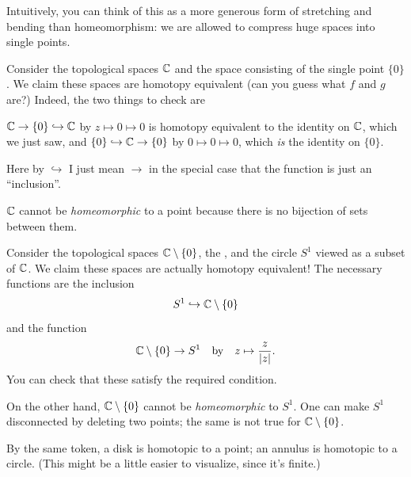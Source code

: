 Intuitively, you can think of this as a more generous form of stretching
and bending than homeomorphism: we are allowed to compress huge spaces into single points.

\begin{example}[$\CC$ is contractible]
	Consider the topological spaces $\CC$
	and the space consisting of the single point $\{0\}$.
	We claim these spaces are homotopy equivalent (can you guess what $f$ and $g$ are?)
	Indeed, the two things to check are
	\begin{enumerate}[(i)]
		\ii $\mathbb C \to \{0\} \hookrightarrow \mathbb C$ by $z \mapsto 0 \mapsto 0$
		is homotopy equivalent to the identity on $\CC$, which we just saw, and
		\ii $\{0\} \hookrightarrow \mathbb C \to \{0\}$ by $0 \mapsto 0 \mapsto 0$, which \emph{is} the identity on $\{0\}$.
	\end{enumerate}
	Here by $\hookrightarrow$ I just mean $\to$ in the special case
	that the function is just an ``inclusion''.
\end{example}
\begin{remark}
	$\CC$ cannot be \emph{homeomorphic} to a point
	because there is no bijection of sets between them.
\end{remark}

\begin{example}
	Consider the topological spaces $\mathbb C \setminus \{0\}$,
	the , and the circle $S^1$ viewed as a subset of $\CC$.
	We claim these spaces are actually homotopy equivalent!
	The necessary functions are the inclusion
	\[ S^1 \hookrightarrow \mathbb C \setminus \{0\} \]
	and the function
	\[ \mathbb C \setminus \{0\} \to S^1
		\quad\text{by}\quad
		z \mapsto \frac{z}{\left\lvert z \right\rvert}. \]
	You can check that these satisfy the required condition.
\end{example}
\begin{remark}
	On the other hand, $\mathbb C \setminus \{0\}$ cannot be \emph{homeomorphic} to $S^1$.
	One can make $S^1$ disconnected by deleting two points;
	the same is not true for $\mathbb C \setminus \{0\}$.
\end{remark}
\begin{example}
	[$\text{Disk} = \text{Point}$, $\text{Annulus} = \text{Circle}$]
	By the same token, a disk is homotopic to a point;
	an annulus is homotopic to a circle.
	(This might be a little easier to visualize, since it's finite.)
\end{example}

